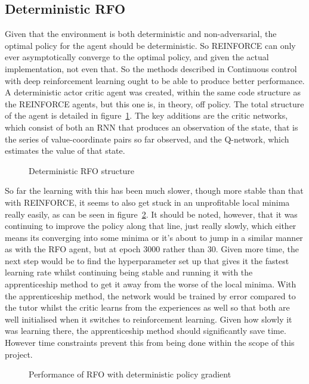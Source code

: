 \subsection{Deterministic RFO}
\label{sec:detrfo}
Given that the environment is both deterministic and non-adversarial, the optimal policy for the agent should be deterministic. So REINFORCE can only ever asymptotically converge to the optimal policy, and given the actual implementation, not even that. So the methods described in Continuous control with deep reinforcement learning\cite{lillicrap2015continuous} ought to be able to produce better performance. A deterministic actor critic agent was created, within the same code structure as the REINFORCE agents, but this one is, in theory, off policy. The total structure of the agent is detailed in figure~\ref{fig:detrfo}. The key additions are the critic networks, which consist of both an RNN that produces an observation of the state, that is the series of value-coordinate pairs so far observed, and the Q-network, which estimates the value of that state.
\begin{figure}
\centering

\caption{Deterministic RFO structure}
\label{fig:detrfo}
\end{figure}

So far the learning with this has been much slower, though more stable than that with REINFORCE, it seems to also get stuck in an unprofitable local minima really easily, as can be seen in figure~\ref{fig:detpolgrad}. It should be noted, however, that it was continuing to improve the policy along that line, just really slowly, which either means its converging into some minima or it's about to jump in a similar manner as with the RFO agent, but at epoch 3000 rather than 30. Given more time, the next step would be to find the hyperparameter set up that gives it the fastest learning rate whilst continuing being stable and running it with the apprenticeship method to get it away from the worse of the local minima.  With the apprenticeship method, the network would be trained by error compared to the tutor whilst the critic learns from the experiences as well so that both are well initialised when it switches to reinforcement learning. Given how slowly it was learning there, the apprenticeship method should significantly save time. However time constraints prevent this from being done within the scope of this project.

\begin{figure}
\centering

\caption{Performance of RFO with deterministic policy gradient}
\label{fig:detpolgrad}
\end{figure}

